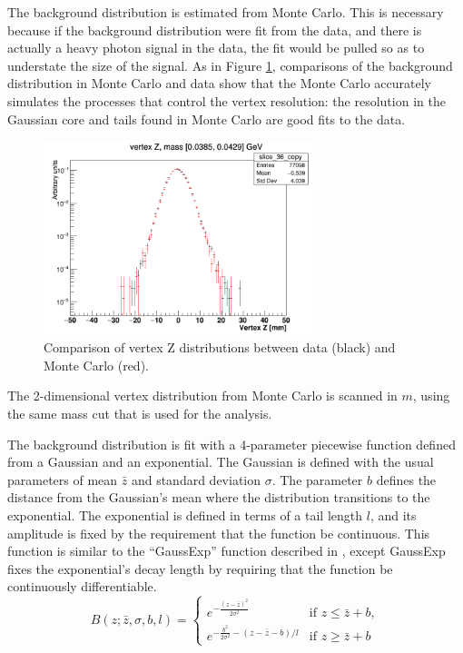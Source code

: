 The background distribution is estimated from Monte Carlo.
This is necessary because if the background distribution were fit from the data, and there is actually a heavy photon signal in the data, the fit would be pulled so as to understate the size of the signal.
As in Figure \ref{fig:vertex_data-mc}, comparisons of the background distribution in Monte Carlo and data show that the Monte Carlo accurately simulates the processes that control the vertex resolution: the resolution in the Gaussian core and tails found in Monte Carlo are good fits to the data.

\begin{figure}[ht]
\begin{center}
    \includegraphics[width=0.7\textwidth]{vertexing/figs/slice-36}
\end{center}
\caption{Comparison of vertex Z distributions between data (black) and Monte Carlo (red).}
    \label{fig:vertex_data-mc}
\end{figure}

The 2-dimensional vertex distribution from Monte Carlo is scanned in $m$, using the same mass cut that is used for the analysis.

The background distribution is fit with a 4-parameter piecewise function defined from a Gaussian and an exponential.
The Gaussian is defined with the usual parameters of mean $\bar{z}$ and standard deviation $\sigma$.
The parameter $b$ defines the distance from the Gaussian's mean where the distribution transitions to the exponential.
The exponential is defined in terms of a tail length $l$, and its amplitude is fixed by the requirement that the function be continuous.
This function is similar to the ``GaussExp'' function described in \cite{cms_collaboration_search_2015}, except GaussExp fixes the exponential's decay length by requiring that the function be continuously differentiable.
\begin{equation}
B(z;\bar{z},\sigma,b,l)=
\begin{cases}
e^{-\frac{(z-\bar{z})^2}{2\sigma^2}} &\text{if } z\le\bar{z}+b,\\
e^{-\frac{b^2}{2\sigma^2} - (z-\bar{z}-b)/l}  &\text{if } z\ge\bar{z}+b
\end{cases}
\label{eq:gaussexp}
\end{equation}

